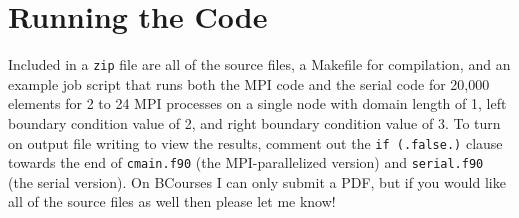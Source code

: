 \documentclass[10pt]{article}
\begin{document}
\section{Running the Code}
Included in a {\tt zip} file are all of the source files, a Makefile for compilation, and an example job script that runs both the MPI code and the serial code for 20,000 elements for 2 to 24 MPI processes on a single node with domain length of 1, left boundary condition value of 2, and right boundary condition value of 3. To turn on output file writing to view the results, comment out the {\tt if (.false.)} clause towards the end of {\tt cmain.f90} (the MPI-parallelized version) and {\tt serial.f90} (the serial version). On BCourses I can only submit a PDF, but if you would like all of the source files as well then please let me know!
\end{document}
